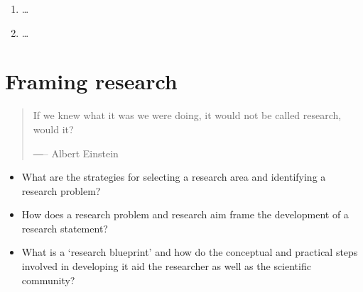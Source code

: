 \documentclass[
  letterpaper,
]{latex/krantz}
\providecommand{\tightlist}{%
  \setlength{\itemsep}{0pt}\setlength{\parskip}{0pt}}\usepackage{longtable,booktabs,array}
\begin{document}

\begin{enumerate}
\def\labelenumi{\arabic{enumi}.}
\tightlist
\item
  \ldots{}
\item
  \ldots{}
\end{enumerate}

\hypertarget{sec-framing-research}{%
\chapter{Framing research}\label{sec-framing-research}}

\begin{quote}
If we knew what it was we were doing, it would not be called research,
would it?

―-- Albert Einstein
\end{quote}

\begin{tcolorbox}[enhanced jigsaw, toprule=.15mm, bottomtitle=1mm, coltitle=black, title=\textcolor{quarto-callout-note-color}{\faInfo}\hspace{0.5em}{Keys}, left=2mm, colframe=quarto-callout-note-color-frame, bottomrule=.15mm, colbacktitle=quarto-callout-note-color!10!white, leftrule=.75mm, colback=white, titlerule=0mm, breakable, toptitle=1mm, opacityback=0, arc=.35mm, rightrule=.15mm, opacitybacktitle=0.6]

\begin{itemize}
\tightlist
\item
  What are the strategies for selecting a research area and identifying
  a research problem?
\item
  How does a research problem and research aim frame the development of
  a research statement?
\item
  What is a `research blueprint' and how do the conceptual and practical
  steps involved in developing it aid the researcher as well as the
  scientific community?
\end{itemize}

\end{tcolorbox}
\end{document}
